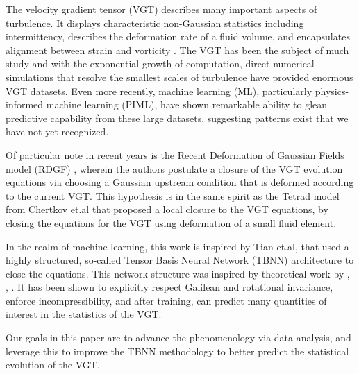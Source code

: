 The velocity gradient tensor (VGT) describes many important aspects of turbulence. It displays characteristic non-Gaussian statistics including intermittency, describes the deformation rate of a fluid volume, and encapsulates alignment between strain and vorticity \cite{meneveau2011lagrangian}. The VGT has been the subject of much study and with the exponential growth of computation, direct numerical simulations that resolve the smallest scales of turbulence have provided enormous VGT datasets. Even more recently, machine learning (ML), particularly physics-informed machine learning (PIML), have shown remarkable ability to glean predictive capability from these large datasets, suggesting patterns exist that we have not yet recognized.

Of particular note in recent years is the Recent Deformation of Gaussian Fields model (RDGF) \cite{johnson2016}, wherein the authors postulate a closure of the VGT evolution equations via choosing a Gaussian upstream condition that is deformed according to the current VGT. This hypothesis is in the same spirit as the Tetrad model from Chertkov et.al \cite{chertkov1999} that proposed a local closure to the VGT equations, by closing the equations for the VGT using deformation of a small fluid element. 

In the realm of machine learning, this work is inspired by Tian et.al\cite{tian2021}, that used a highly structured, so-called Tensor Basis Neural Network (TBNN) architecture to close the equations. This network structure was inspired by theoretical work by \cite{pope1975}, \cite{lawson2015}, \cite{johnson2016}. It has been shown to explicitly respect Galilean and rotational invariance, enforce incompressibility, and after training, can predict many quantities of interest in the statistics of the VGT.

Our goals in this paper are to advance the phenomenology via data analysis, and leverage this to improve the TBNN methodology to better predict the statistical evolution of the VGT.